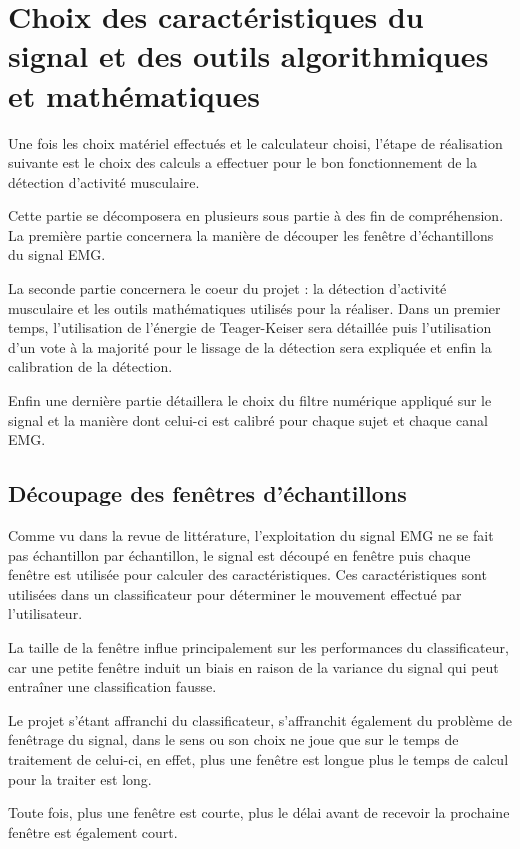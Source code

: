 \documentclass[letterpaper, twoside, 12pt, memoire, creativecommons, hyperref]{thETS}
\begin{document}
\section{Choix des caractéristiques du signal et des outils algorithmiques et mathématiques}

Une fois les choix matériel effectués et le calculateur choisi, l'étape de réalisation suivante est le choix des calculs a effectuer pour le bon fonctionnement de la détection d'activité musculaire. 

Cette partie se décomposera en plusieurs sous partie à des fin de compréhension. La première partie concernera la manière de découper les fenêtre d'échantillons du signal EMG. 

La seconde partie concernera le coeur du projet : la détection d'activité musculaire et les outils mathématiques utilisés pour la réaliser. Dans un premier temps, l'utilisation de l'énergie de Teager-Keiser sera détaillée puis l'utilisation d'un vote à la majorité pour le lissage de la détection sera expliquée et enfin la calibration de la détection.

Enfin une dernière partie détaillera le choix du filtre numérique appliqué sur le signal et la manière dont celui-ci est calibré pour chaque sujet et chaque canal EMG.

\subsection{Découpage des fenêtres d'échantillons}
\label{CHfenetrage}

Comme vu dans la revue de littérature, l'exploitation du signal EMG ne se fait pas échantillon par échantillon, le signal est découpé en fenêtre puis chaque fenêtre est utilisée pour calculer des caractéristiques. Ces caractéristiques sont utilisées dans un classificateur pour déterminer le mouvement effectué par l'utilisateur. 

La taille de la fenêtre influe principalement sur les performances du classificateur, car une petite fenêtre induit un biais en raison de la variance du signal qui peut entraîner une classification fausse. 

Le projet s'étant affranchi du classificateur, s'affranchit également du problème de fenêtrage du signal, dans le sens ou son choix ne joue que sur le temps de traitement de celui-ci, en effet, plus une fenêtre est longue plus le temps de calcul pour la traiter est long. 

Toute fois, plus une fenêtre est courte, plus le délai avant de recevoir la prochaine fenêtre est également court. 
\end{document}
